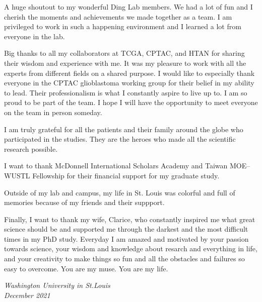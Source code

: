 A huge shoutout to my wonderful Ding Lab members.
We had a lot of fun and I cherish the moments and achievements we made together as a team.
I am privileged to work in such a happening environment and I learned a lot from everyone in the lab.

Big thanks to all my collaborators at TCGA, CPTAC, and HTAN for sharing their wisdom and experience with me.
It was my pleasure to work with all the experts from different fields on a shared purpose.
I would like to especially thank everyone in the CPTAC glioblastoma working group for their belief in my ability to lead.
Their professionalism is what I constantly aspire to live up to.
I am so proud to be part of the team.
I hope I will have the opportunity to meet everyone on the team in person someday.

I am truly grateful for all the patients and their family around the globe who participated in the studies.
They are the heroes who made all the scientific research possible.

I want to thank McDonnell International Scholars Academy and Taiwan MOE--WUSTL Fellowship for their financial support for my graduate study.

Outside of my lab and campus, my life in St. Louis was colorful and full of memories because of my friends and their suppport.


Finally, I want to thank my wife, Clarice, who constantly inspired me what great science should be and supported me through the darkest and the most difficult times in my PhD study.
Everyday I am amazed and motivated by your passion towards science, your wisdom and knowledge about resarch and everything in life, and your creativity to make things so fun and all the obstacles and failures so easy to overcome.
You are my muse. You are my life.

\null\hfill \thesisauthor

\noindent
\textit{Washington University in St.\@ Louis}\\
\textit{December 2021}
